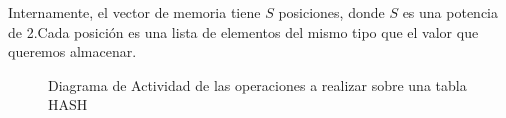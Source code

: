 Internamente, el vector de memoria tiene $S$ posiciones, donde $S$ es una potencia de 2.Cada posición es una lista de 
elementos del mismo tipo que el valor que queremos almacenar.

\begin{figure}[hbtp]
\centering
{}%
\hfill
{}%
%
\caption{Diagrama de Actividad de las operaciones a realizar sobre una tabla HASH}
\end{figure}
%

